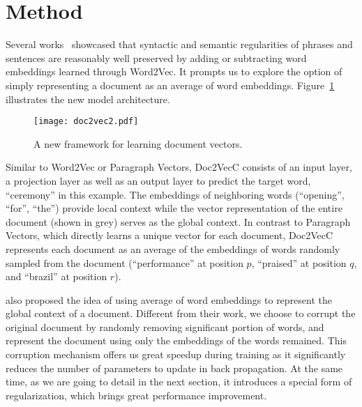 \documentclass{article} \usepackage{iclr2017_conference,times}
\newcommand{\name}{Doc2VecC}
\begin{document}
\section{Method}
\label{method}



Several works~\citep{mikolov2013distributed,mikolov2013linguistic} showcased that syntactic and semantic regularities of phrases and sentences are reasonably well preserved by adding or subtracting word embeddings learned through Word2Vec. It prompts us to explore the option of simply representing a document as an average of word embeddings. Figure~\ref{fig:architecture} illustrates the new model architecture.  
\begin{figure}[h]
\vspace{-0.1in}
\centering
  \texttt{[image: doc2vec2.pdf]}
  \vspace{-0.1in}
  \caption{A new framework for learning document vectors.}
  \label{fig:architecture}
  \vspace{-0.1in}
\end{figure} 

Similar to Word2Vec or Paragraph Vectors, \name{} consists of an input layer, a projection layer as well as an output layer to predict the target word, ``ceremony'' in this example. The embeddings of neighboring words (``opening'', ``for'', ``the'') provide local context while the vector representation of the entire document (shown in grey) serves as the global context.  In contrast to Paragraph Vectors, which directly learns a unique vector for each document, \name{} represents each document as an average of the embeddings of words randomly sampled from the document (``performance'' at position $p$, ``praised'' at position $q$, and ``brazil'' at position $r$). 

\cite{huang2012improving} also proposed the idea of using average of word embeddings to represent the global context of a document. Different from their work, we choose to corrupt the original document by randomly removing significant portion of words, and represent the document using only the embeddings of the words remained.  This corruption mechanism offers us great speedup during training as it significantly reduces the number of parameters to update in back propagation. At the same time, as we are going to detail in the next section, it introduces a special form of regularization, which brings  great performance improvement. 
\end{document}
